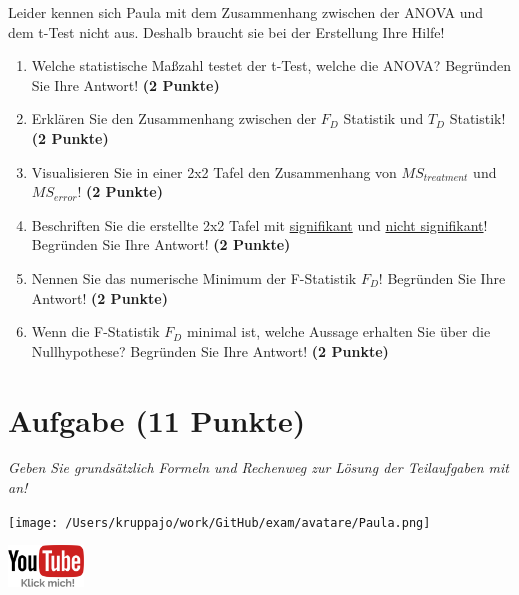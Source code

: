 \documentclass[a4paper, 9pt]{scrartcl}\usepackage[]{graphicx}\usepackage[]{xcolor}
\begin{document}
Leider kennen sich Paula mit dem Zusammenhang zwischen der ANOVA und dem t-Test nicht aus. Deshalb braucht sie bei der Erstellung Ihre Hilfe! 

\begin{enumerate}
\item Welche statistische Maßzahl testet der t-Test, welche die ANOVA? Begründen Sie Ihre Antwort! \textbf{(2 Punkte)}
\item Erklären Sie den Zusammenhang zwischen der $F_{D}$ Statistik und $T_{D}$ Statistik! \textbf{(2 Punkte)}
\item Visualisieren Sie in einer 2x2 Tafel den Zusammenhang von $MS_{treatment}$ und $MS_{error}$! \textbf{(2 Punkte)}
\item Beschriften Sie die erstellte 2x2 Tafel mit \underline{signifikant} und \underline{nicht signifikant}! Begründen Sie Ihre Antwort! \textbf{(2 Punkte)}
\item Nennen Sie das numerische Minimum der F-Statistik $F_D$! Begründen Sie Ihre Antwort! \textbf{(2 Punkte)}
\item Wenn die F-Statistik $F_D$ minimal ist, welche Aussage erhalten Sie über die Nullhypothese? Begründen Sie Ihre Antwort! \textbf{(2 Punkte)}
\end{enumerate}

 
\clearpage

\section{Aufgabe \hfill (11 Punkte)}

\textit{Geben Sie grundsätzlich Formeln und Rechenweg zur Lösung der Teilaufgaben mit an!} \\[1Ex]
 

 
\begin{minipage}[t]{0.5\textwidth}
\texttt{[image: /Users/kruppajo/work/GitHub/exam/avatare/Paula.png]}
\end{minipage}
\begin{minipage}[t]{0.5\textwidth}
\hfill
\href{https://youtu.be/2qG1Dws0MJo}{\includegraphics[width = 2cm]{img/youtube}}
\end{minipage}
\vspace{-3Ex}
\end{document}
